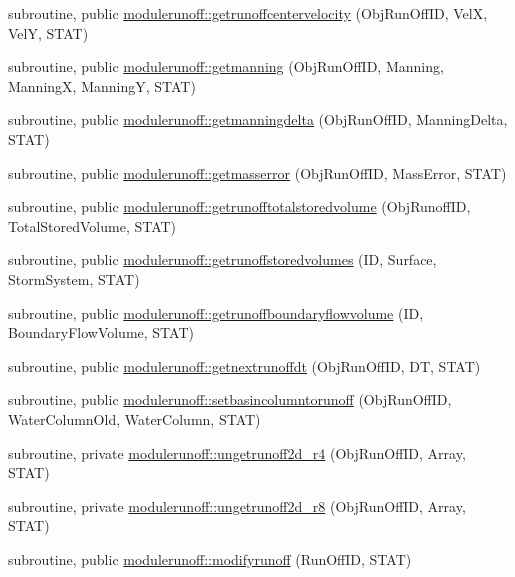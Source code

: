 \begin{DoxyCompactItemize}
\item 
subroutine, public \mbox{\hyperlink{namespacemodulerunoff_af29a57ef10a724fc9c8e0a4f1f22339e}{modulerunoff\+::getrunoffcentervelocity}} (Obj\+Run\+Off\+ID, VelX, VelY, S\+T\+AT)
\item 
subroutine, public \mbox{\hyperlink{namespacemodulerunoff_a2cad42fe7c6c24a46f9a75f3528e8abb}{modulerunoff\+::getmanning}} (Obj\+Run\+Off\+ID, Manning, ManningX, ManningY, S\+T\+AT)
\item 
subroutine, public \mbox{\hyperlink{namespacemodulerunoff_a9ca63f5612ab734b77497c2eca2c05bd}{modulerunoff\+::getmanningdelta}} (Obj\+Run\+Off\+ID, Manning\+Delta, S\+T\+AT)
\item 
subroutine, public \mbox{\hyperlink{namespacemodulerunoff_a9dff5ff4c2ef0ce7078dd08d46ddeb4b}{modulerunoff\+::getmasserror}} (Obj\+Run\+Off\+ID, Mass\+Error, S\+T\+AT)
\item 
subroutine, public \mbox{\hyperlink{namespacemodulerunoff_aa890e5ad105516c116e7c4f53b656bfb}{modulerunoff\+::getrunofftotalstoredvolume}} (Obj\+Runoff\+ID, Total\+Stored\+Volume, S\+T\+AT)
\item 
subroutine, public \mbox{\hyperlink{namespacemodulerunoff_a9d8c0b3cb553adb36c76cde2d6bcaef7}{modulerunoff\+::getrunoffstoredvolumes}} (ID, Surface, Storm\+System, S\+T\+AT)
\item 
subroutine, public \mbox{\hyperlink{namespacemodulerunoff_a3a9224ad169d37f7fdb8eb535513d1b1}{modulerunoff\+::getrunoffboundaryflowvolume}} (ID, Boundary\+Flow\+Volume, S\+T\+AT)
\item 
subroutine, public \mbox{\hyperlink{namespacemodulerunoff_a364cfd3bda8ba61cda13d20f848f20dc}{modulerunoff\+::getnextrunoffdt}} (Obj\+Run\+Off\+ID, DT, S\+T\+AT)
\item 
subroutine, public \mbox{\hyperlink{namespacemodulerunoff_a1bdc99360bd152034690c7eed836b2cf}{modulerunoff\+::setbasincolumntorunoff}} (Obj\+Run\+Off\+ID, Water\+Column\+Old, Water\+Column, S\+T\+AT)
\item 
subroutine, private \mbox{\hyperlink{namespacemodulerunoff_acd023a67da604bbfb903587e80244138}{modulerunoff\+::ungetrunoff2d\+\_\+r4}} (Obj\+Run\+Off\+ID, Array, S\+T\+AT)
\item 
subroutine, private \mbox{\hyperlink{namespacemodulerunoff_af00779fc9a81a3cdf2947f1c7990d1c8}{modulerunoff\+::ungetrunoff2d\+\_\+r8}} (Obj\+Run\+Off\+ID, Array, S\+T\+AT)
\item 
subroutine, public \mbox{\hyperlink{namespacemodulerunoff_a43ce9e041625ab643d74cc279ddf43db}{modulerunoff\+::modifyrunoff}} (Run\+Off\+ID, S\+T\+AT)

\end{DoxyCompactItemize}
